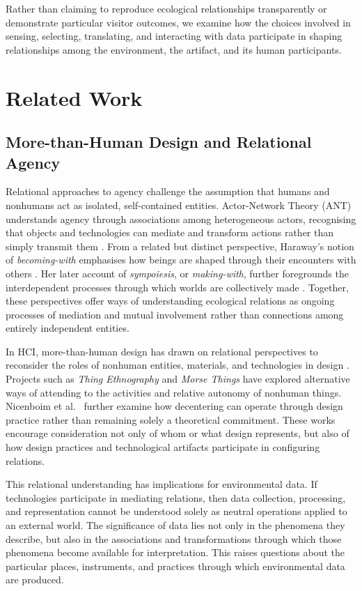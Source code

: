 \documentclass[manuscript,review,anonymous]{acmart}
\begin{document}
Rather than claiming to reproduce ecological relationships transparently or demonstrate particular visitor outcomes, we examine how the choices involved in sensing, selecting, translating, and interacting with data participate in shaping relationships among the environment, the artifact, and its human participants.

\section{Related Work}

\subsection{More-than-Human Design and Relational Agency}

Relational approaches to agency challenge the assumption that humans and nonhumans act as isolated, self-contained entities. Actor-Network Theory (ANT) understands agency through associations among heterogeneous actors, recognising that objects and technologies can mediate and transform actions rather than simply transmit them \cite{latour2005}. From a related but distinct perspective, Haraway’s notion of \emph{becoming-with} emphasises how beings are shaped through their encounters with others \cite{haraway2008}. Her later account of \emph{sympoiesis}, or \emph{making-with}, further foregrounds the interdependent processes through which worlds are collectively made \cite{haraway2016}. Together, these perspectives offer ways of understanding ecological relations as ongoing processes of mediation and mutual involvement rather than connections among entirely independent entities.

In HCI, more-than-human design has drawn on relational perspectives to reconsider the roles of nonhuman entities, materials, and technologies in design \cite{giaccardi2020,wakkary2021}. Projects such as \emph{Thing Ethnography} \cite{giaccardi2016} and \emph{Morse Things} \cite{wakkary2017} have explored alternative ways of attending to the activities and relative autonomy of nonhuman things. Nicenboim et al.~\cite{nicenboim2025} further examine how decentering can operate through design practice rather than remaining solely a theoretical commitment. These works encourage consideration not only of whom or what design represents, but also of how design practices and technological artifacts participate in configuring relations.

This relational understanding has implications for environmental data. If technologies participate in mediating relations, then data collection, processing, and representation cannot be understood solely as neutral operations applied to an external world. The significance of data lies not only in the phenomena they describe, but also in the associations and transformations through which those phenomena become available for interpretation. This raises questions about the particular places, instruments, and practices through which environmental data are produced.
\end{document}
